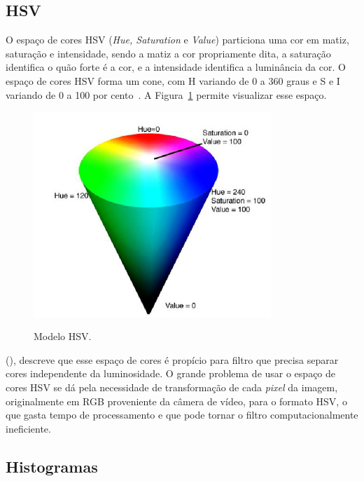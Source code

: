 \subsection{HSV}
\label{subsec:hsv}

O espaço de cores HSV (\textit{Hue, Saturation} e \textit{Value}) particiona uma cor em matiz, saturação e intensidade, sendo a matiz a cor propriamente dita, a saturação identifica o quão forte é a cor, e a intensidade identifica a luminância da cor. O espaço de cores HSV forma um cone, com H variando de 0 a 360 graus e S e I variando de 0 a 100 por cento~\cite{penharbel2004filtro}. A Figura~\ref{fig:modeloHSV} permite visualizar esse espaço.

\begin{figure}[!hbtp]
  \centering
   \caption{Modelo HSV.}
    \includegraphics[width = 0.8\textwidth]{Caps/Figs/ref-teorico/modelo-HSV.png}
   \label{fig:modeloHSV}
\end{figure}

\citeauthor{penharbel2004filtro} (\citeyear{penharbel2004filtro}), descreve que esse espaço de cores é propício para filtro que precisa separar cores independente da luminosidade. O grande problema de usar o espaço de cores HSV se dá pela necessidade de transformação de cada \textit{pixel} da imagem, originalmente em RGB proveniente da câmera de vídeo, para o formato HSV, o que gasta tempo de processamento e que pode tornar o filtro computacionalmente ineficiente.

\subsection{Histogramas}
\label{subsec:histogramas}

